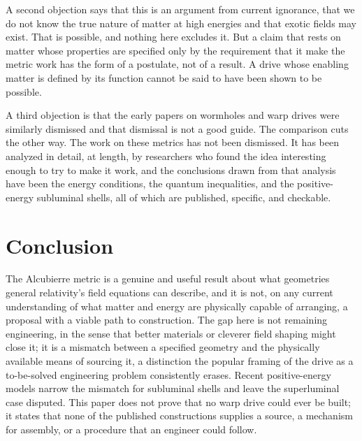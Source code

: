 \documentclass[11pt]{article}
\begin{document}
A second objection says that this is an argument from current ignorance, that we do not know the true nature of matter at high energies and that exotic fields may exist. That is possible, and nothing here excludes it. But a claim that rests on matter whose properties are specified only by the requirement that it make the metric work has the form of a postulate, not of a result. A drive whose enabling matter is defined by its function cannot be said to have been shown to be possible.

A third objection is that the early papers on wormholes and warp drives were similarly dismissed and that dismissal is not a good guide. The comparison cuts the other way. The work on these metrics has not been dismissed. It has been analyzed in detail, at length, by researchers who found the idea interesting enough to try to make it work, and the conclusions drawn from that analysis have been the energy conditions, the quantum inequalities, and the positive-energy subluminal shells, all of which are published, specific, and checkable.

\section{Conclusion}

The Alcubierre metric is a genuine and useful result about what geometries general relativity's field equations can describe, and it is not, on any current understanding of what matter and energy are physically capable of arranging, a proposal with a viable path to construction. The gap here is not remaining engineering, in the sense that better materials or cleverer field shaping might close it; it is a mismatch between a specified geometry and the physically available means of sourcing it, a distinction the popular framing of the drive as a to-be-solved engineering problem consistently erases. Recent positive-energy models narrow the mismatch for subluminal shells and leave the superluminal case disputed. This paper does not prove that no warp drive could ever be built; it states that none of the published constructions supplies a source, a mechanism for assembly, or a procedure that an engineer could follow.
\end{document}
